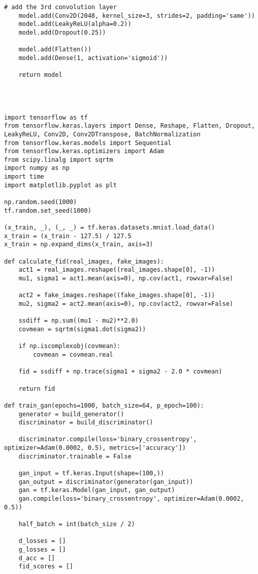 \begin{lstlisting}[style=mypython, caption=Explore GAN with more convolutional layers 6]
    # add the 3rd convolution layer
    model.add(Conv2D(2048, kernel_size=3, strides=2, padding='same'))
    model.add(LeakyReLU(alpha=0.2))
    model.add(Dropout(0.25))

    model.add(Flatten())
    model.add(Dense(1, activation='sigmoid'))

    return model




import tensorflow as tf
from tensorflow.keras.layers import Dense, Reshape, Flatten, Dropout, LeakyReLU, Conv2D, Conv2DTranspose, BatchNormalization
from tensorflow.keras.models import Sequential
from tensorflow.keras.optimizers import Adam
from scipy.linalg import sqrtm
import numpy as np
import time
import matplotlib.pyplot as plt

np.random.seed(1000)
tf.random.set_seed(1000)

(x_train, _), (_, _) = tf.keras.datasets.mnist.load_data()
x_train = (x_train - 127.5) / 127.5
x_train = np.expand_dims(x_train, axis=3)

def calculate_fid(real_images, fake_images):
    act1 = real_images.reshape((real_images.shape[0], -1))
    mu1, sigma1 = act1.mean(axis=0), np.cov(act1, rowvar=False)
    
    act2 = fake_images.reshape((fake_images.shape[0], -1))
    mu2, sigma2 = act2.mean(axis=0), np.cov(act2, rowvar=False)
    
    ssdiff = np.sum((mu1 - mu2)**2.0)
    covmean = sqrtm(sigma1.dot(sigma2))
    
    if np.iscomplexobj(covmean):
        covmean = covmean.real
    
    fid = ssdiff + np.trace(sigma1 + sigma2 - 2.0 * covmean)
    
    return fid

def train_gan(epochs=1000, batch_size=64, p_epoch=100):
    generator = build_generator()
    discriminator = build_discriminator()

    discriminator.compile(loss='binary_crossentropy', optimizer=Adam(0.0002, 0.5), metrics=['accuracy'])
    discriminator.trainable = False

    gan_input = tf.keras.Input(shape=(100,))
    gan_output = discriminator(generator(gan_input))
    gan = tf.keras.Model(gan_input, gan_output)
    gan.compile(loss='binary_crossentropy', optimizer=Adam(0.0002, 0.5))

    half_batch = int(batch_size / 2)
    
    d_losses = []
    g_losses = []
    d_acc = []
    fid_scores = []
    

\end{lstlisting}
